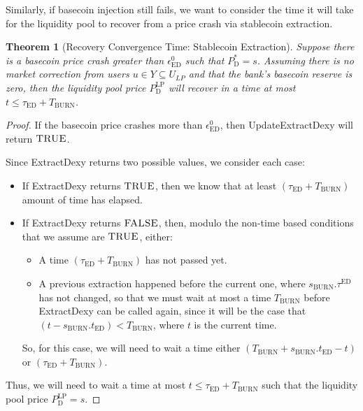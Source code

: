 \documentclass{ifcolog}
\newcommand{\Pdt}{P_{\mathrm{D}}^{*}}
\newcommand{\Plp}{P_{\mathrm{D}}^{\mathrm{LP}}}
\newcommand{\sburn}{s_{\textrm{BURN}}}
\newcommand{\ulp}{U_{LP}}
\newcommand{\epsilondexyzero}{\epsilon_{\textrm{ED}}^{0}}
\newtheorem{theorem}{Theorem}
\begin{document}
Similarly, if basecoin injection still fails, we want to consider the time it will take for the liquidity pool to recover 
from a price crash via stablecoin extraction.

\begin{theorem}[Recovery Convergence Time: Stablecoin Extraction]
  Suppose there is a basecoin price crash greater than $\epsilondexyzero$ such that $\Pdt = s$. Assuming there is no 
  market correction from users $u \in Y \subseteq \ulp$ and that the bank's basecoin reserve is zero, 
  then the liquidity pool price $\Plp$ will recover in a time at most $t \le \tau_{\textrm{ED}} + T_{\textrm{BURN}}$.
\end{theorem}

\begin{proof}
  If the basecoin price crashes more than $\epsilondexyzero$, then UpdateExtractDexy will return
  $\textsc{TRUE}$.
  
  Since ExtractDexy returns two possible values, we consider each case:
  \begin{itemize}
    \item If ExtractDexy returns $\textsc{TRUE}$, then we know that at least
          $(\tau_{\textrm{ED}} + T_{\textrm{BURN}})$ amount of time has elapsed.
    \item If ExtractDexy returns $\textsc{FALSE}$, then, 
          modulo the non-time based conditions that we assume are $\textsc{TRUE}$, either:
          \begin{itemize}
            \item A time $(\tau_{\textrm{ED}} + T_{\textrm{BURN}})$ has not passed yet.
            \item A previous extraction happened before the current one, where $\sburn.\tau^{\textrm{ED}}$ has not changed,
                  so that we must wait at most a time $T_{\textrm{BURN}}$ before ExtractDexy can be called again,
                  since it will be the case that $(t - \sburn.t_{\textrm{ED}}) < T_{\textrm{BURN}}$, where $t$ is the current time.
          \end{itemize}
          So, for this case, we will need to wait a time either $\left(T_{\textrm{BURN}} + \sburn.t_{\textrm{ED}} - t\right)$ or $\left(\tau_{\textrm{ED}} + T_{\textrm{BURN}}\right)$.
  \end{itemize}
  Thus, we will need to wait a time at most $t \le \tau_{\textrm{ED}} + T_{\textrm{BURN}}$
  such that the liquidity pool price $\Plp = s$.
\end{proof}
\end{document}
